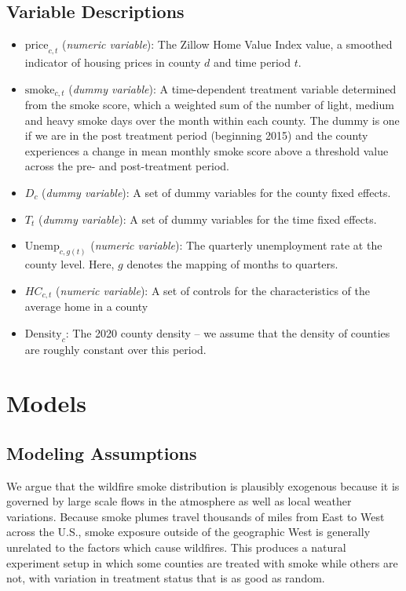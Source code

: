 \documentclass[12pt]{article}
\begin{document}
\begin{singlespace}

\subsection{Variable Descriptions}

\begin{itemize}
\item $\text{price}_{c,t}$ (\textit{numeric variable}): The Zillow Home Value Index 
value, a smoothed indicator of housing prices in county $d$ and time period $t$.
\item $\text{smoke}_{c,t}$ (\textit{dummy variable}): A time-dependent treatment variable
determined from the smoke score, which a weighted sum of the number of light, medium
and heavy smoke days over the month within each county.  The dummy is one if we are in the
post treatment period (beginning 2015) and the county
experiences a change in mean monthly smoke score above a threshold value across the pre- and post-treatment period.
\item $D_c$ (\textit{dummy variable}): A set of dummy variables for the county fixed effects.  
\item $T_t$ (\textit{dummy variable}): A set of dummy variables for the time fixed  effects.
\item $\text{Unemp}_{c,g(t)}$ (\textit{numeric variable}): The quarterly unemployment rate at the county level.  Here, $g$ denotes the mapping of months to quarters.  
\item $HC_{c,t}$ (\textit{numeric variable}): A set of controls for the characteristics of the average home in a county
\item $\text{Density}_c$: The 2020 county density -- we assume that the density of counties are roughly constant over this period.
\end{itemize}
\end{singlespace}


\section{Models}

\subsection{Modeling Assumptions}

We argue that the wildfire smoke distribution is plausibly exogenous because it is governed by large scale flows in the atmosphere as well as local weather variations.  Because smoke plumes travel thousands of miles from East to West across the U.S., smoke exposure outside of the geographic West is generally unrelated to the factors which cause wildfires.  This produces a natural experiment setup in which some counties are treated with smoke while others are not, with variation in treatment status that is as good as random.   
\end{document}
